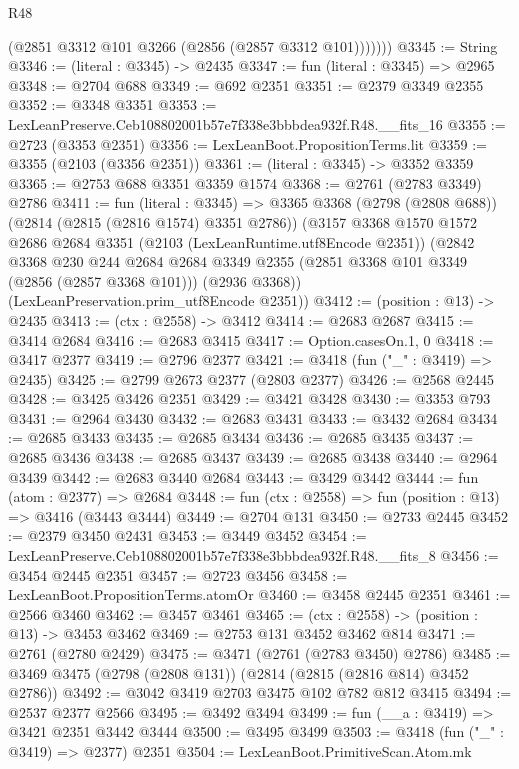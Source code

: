 \begin{lexlean}{R48}
\begin{coremodule}
            (@2851 @3312 @101 @3266 (@2856 (@2857 @3312 @101)))))))
@3345 := String
@3346 := (literal : @3345) -> @2435
@3347 := fun (literal : @3345) => @2965
@3348 := @2704 @688
@3349 := @692 @2351
@3351 := @2379 @3349 @2355
@3352 := @3348 @3351
@3353 := LexLeanPreserve.Ceb108802001b57e7f338e3bbbdea932f.R48.__fits_16
@3355 := @2723 (@3353 @2351)
@3356 := LexLeanBoot.PropositionTerms.lit
@3359 := @3355 (@2103 (@3356 @2351))
@3361 := (literal : @3345) -> @3352 @3359
@3365 := @2753 @688 @3351 @3359 @1574
@3368 := @2761 (@2783 @3349) @2786
@3411 := fun (literal : @3345) =>
  @3365
    @3368
    (@2798 (@2808 @688))
    (@2814 (@2815 (@2816 @1574) @3351 @2786))
    (@3157
      @3368
      @1570
      @1572
      @2686
      @2684
      @3351
      (@2103 (LexLeanRuntime.utf8Encode @2351))
      (@2842
        @3368
        @230
        @244
        @2684
        @2684
        @3349
        @2355
        (@2851 @3368 @101 @3349 (@2856 (@2857 @3368 @101)))
        (@2936 @3368))
      (LexLeanPreservation.prim_utf8Encode @2351))
@3412 := (position : @13) -> @2435
@3413 := (ctx : @2558) -> @3412
@3414 := @2683 @2687
@3415 := @3414 @2684
@3416 := @2683 @3415
@3417 := Option.casesOn.{1, 0}
@3418 := @3417 @2377
@3419 := @2796 @2377
@3421 := @3418 (fun ("_" : @3419) => @2435)
@3425 := @2799 @2673 @2377 (@2803 @2377)
@3426 := @2568 @2445
@3428 := @3425 @3426 @2351
@3429 := @3421 @3428
@3430 := @3353 @793
@3431 := @2964 @3430
@3432 := @2683 @3431
@3433 := @3432 @2684
@3434 := @2685 @3433
@3435 := @2685 @3434
@3436 := @2685 @3435
@3437 := @2685 @3436
@3438 := @2685 @3437
@3439 := @2685 @3438
@3440 := @2964 @3439
@3442 := @2683 @3440 @2684
@3443 := @3429 @3442
@3444 := fun (atom : @2377) => @2684
@3448 := fun (ctx : @2558) => fun (position : @13) => @3416 (@3443 @3444)
@3449 := @2704 @131
@3450 := @2733 @2445
@3452 := @2379 @3450 @2431
@3453 := @3449 @3452
@3454 := LexLeanPreserve.Ceb108802001b57e7f338e3bbbdea932f.R48.__fits_8
@3456 := @3454 @2445 @2351
@3457 := @2723 @3456
@3458 := LexLeanBoot.PropositionTerms.atomOr
@3460 := @3458 @2445 @2351
@3461 := @2566 @3460
@3462 := @3457 @3461
@3465 := (ctx : @2558) -> (position : @13) -> @3453 @3462
@3469 := @2753 @131 @3452 @3462 @814
@3471 := @2761 (@2780 @2429)
@3475 := @3471 (@2761 (@2783 @3450) @2786)
@3485 := @3469 @3475 (@2798 (@2808 @131)) (@2814 (@2815 (@2816 @814) @3452 @2786))
@3492 := @3042 @3419 @2703 @3475 @102 @782 @812 @3415
@3494 := @2537 @2377 @2566
@3495 := @3492 @3494
@3499 := fun (__a : @3419) => @3421 @2351 @3442 @3444
@3500 := @3495 @3499
@3503 := @3418 (fun ("_" : @3419) => @2377) @2351
@3504 := LexLeanBoot.PrimitiveScan.Atom.mk

\end{coremodule}
\end{lexlean}
